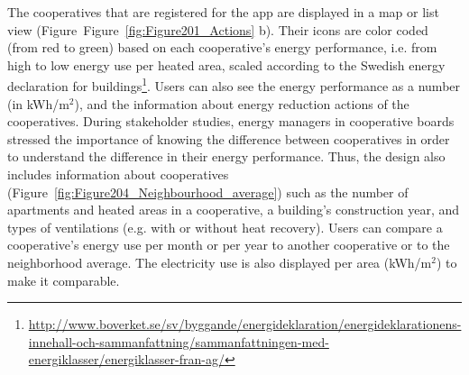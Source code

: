 The cooperatives that are registered for the app are displayed in a map or list view (Figure~Figure~\ref{fig:Figure201_Actions} b). Their icons are color coded (from red to green) based on each cooperative's energy performance, i.e. from high to low energy use per heated area, scaled according to the Swedish energy declaration for buildings\footnote{\url{http://www.boverket.se/sv/byggande/energideklaration/energideklarationens-innehall-och-sammanfattning/sammanfattningen-med-energiklasser/energiklasser-fran-ag/}}. 
% 
Users can also see the energy performance as a number (in kWh/m$^2$), and the information about energy reduction actions of the cooperatives. %
% 
During stakeholder studies, energy managers in cooperative boards stressed the importance of knowing the difference between cooperatives in order to understand the difference in their energy performance. Thus, the design also includes information about cooperatives (Figure~\ref{fig:Figure204_Neighbourhood_average}) such as the number of apartments and heated areas in a cooperative, a building's construction year, and types of ventilations (e.g. with or without heat recovery).
% 
Users can compare a cooperative's energy use per month or per year to another cooperative or to the neighborhood average. The electricity use is also displayed per area (kWh/m$^2$) to make it comparable.
